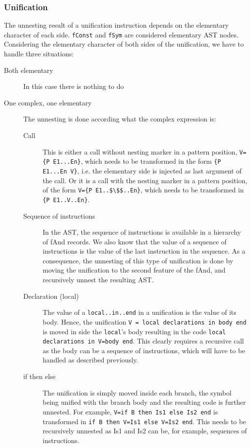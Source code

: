 \documentclass[a4paper]{memoir}
\begin{document}
\subsubsection{Unification}\label{sec:arch:unnester:unification}
The unnesting result of a unification instruction depends on the elementary
character of each side. \lstinline!fConst! and \lstinline!fSym! are considered elementary AST nodes.
Considering the elementary character of both sides of the unification, we have to handle three situations:
\begin{description}
  \item[Both elementary]In this case there is nothing to do
  \item[One complex, one elementary] The unnesting is done according what the
    complex expression is: 
    \begin{description}
      \item[Call] This is either a call without nesting marker in a pattern position, \lstinline!V={P E1...En}!,
        which needs to be transformed in the form \lstinline!{P E1...En V}!, i.e. the elementary side is injected as last argument of the call.
        Or it is a call with the nesting marker in a pattern position, of the form \lstinline[mathescape]!V={P E1..$\$$..En}!, which needs to be
        transformed in \lstinline!{P E1..V..En}!.
      \item[Sequence of instructions] In the AST, the sequence of instructions is available in a hierarchy of fAnd records. We also know that the value of a sequence of instructions is the value of the last instruction in the sequence. As a consequence, the unnesting of this type of unification is done by moving the unification to the second feature of the fAnd, and recursively unnest the resulting AST.
      \item[Declaration (local)] The value of a \lstinline!local..in..end! in a
        unification is the value of its body. Hence, the unification
        \lstinline!V = local declarations in body end! is moved in side the
        \lstinline!local!'s body resulting in the code \lstinline!local declarations in V=body end!. This clearly requires a recursive call as the body can be a sequence of instructions, which will have to be handled as described previously.
      \item[if then else] The unification is simply moved inside each branch,
        the symbol being unified with the branch body and the resulting code is further unnested. For example, \lstinline!V=if B then Is1 else Is2 end! is transformed in \lstinline!if B then V=Is1 else V=Is2 end!. This needs to be recursively unnested as Is1 and Is2 can be, for example,  sequences of instructions.

\end{description}
\end{description}
\end{document}
